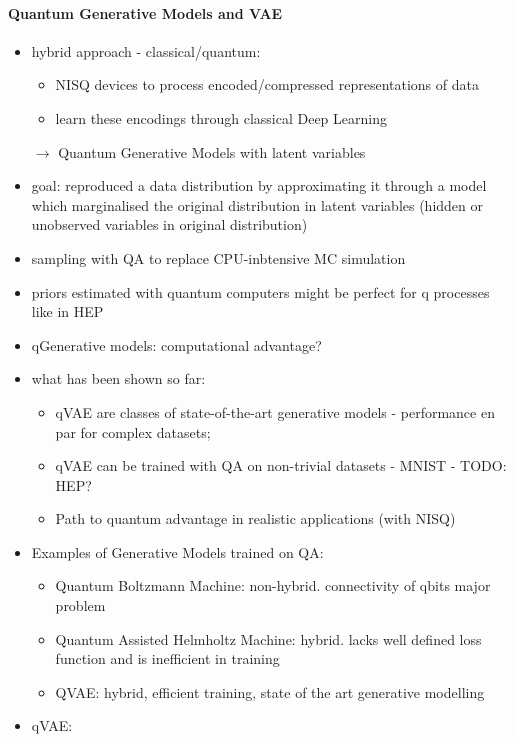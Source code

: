\paragraph{Quantum Generative Models and VAE}
\begin{itemize}
  \item hybrid approach - classical/quantum:
  \begin{itemize}
	\item NISQ devices to process encoded/compressed representations of data
	\item learn these encodings through classical Deep Learning
  \end{itemize}
  \item[$\rightarrow$] Quantum Generative Models with latent variables
  \item goal: reproduced a data distribution by approximating it through a model
	which marginalised the original distribution in latent variables (hidden or
	unobserved variables in original distribution)
\item sampling with QA to replace CPU-inbtensive MC simulation
\item priors estimated with quantum computers might be perfect for q processes
  like in HEP
\item qGenerative models: computational advantage?
\item what has been shown so far:
  \begin{itemize}
	\item qVAE are classes of state-of-the-art generative models - performance
	  en par for complex datasets;
	\item qVAE can be trained with QA on non-trivial datasets - MNIST - TODO:
	  HEP? 
	\item Path to quantum advantage in realistic applications (with NISQ)
  \end{itemize}
	\item Examples of Generative Models trained on QA:
  \begin{itemize}
	\item Quantum Boltzmann Machine: non-hybrid. connectivity of qbits major
	  problem
	\item Quantum Assisted Helmholtz Machine: hybrid. lacks well defined loss
	  function and is inefficient in training
	\item QVAE: hybrid, efficient training, state of the art generative
	  modelling
  \end{itemize}
\item qVAE: 

\end{itemize}
